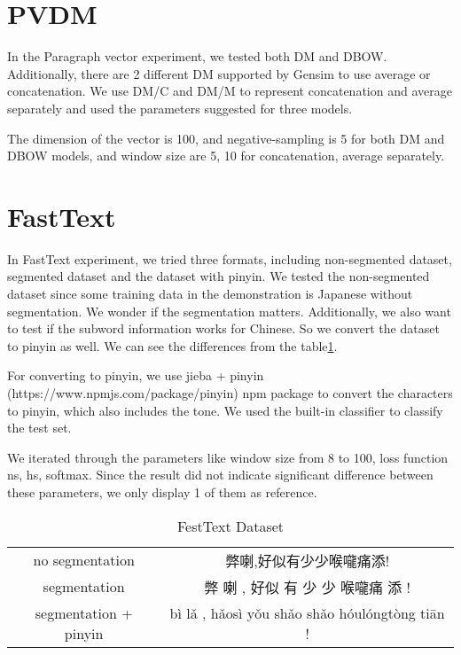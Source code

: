 \section{PVDM}

In the Paragraph vector experiment, we tested both DM and DBOW. Additionally, there are 2 different DM supported by Gensim to use average or concatenation.
We use DM/C and DM/M to represent concatenation and average separately and used the parameters suggested for three models. 

The dimension of the vector is 100, and negative-sampling is 5 for both DM and DBOW models, and window size are 5, 10 for concatenation, average separately. 


\section{FastText}

In FastText experiment, we tried three formats, including non-segmented dataset, segmented dataset and the dataset with pinyin.
We tested the non-segmented dataset since some training data in the demonstration is Japanese without segmentation. We wonder if the segmentation matters.
Additionally, we also want to test if the subword information \cite{bojanowski2016enriching} works for Chinese. So we convert the dataset to pinyin as well. We can see the differences from the table\ref{ftdataset}.

For converting to pinyin, we use jieba + pinyin (https://www.npmjs.com/package/pinyin) npm package to convert the characters to pinyin, which also includes the tone.
We used the built-in classifier to classify the test set.

We iterated through the parameters like window size from 8 to 100, loss function ns, hs, softmax.  
Since the result did not indicate significant difference between these parameters, we only display 1 of them as reference. 


\begin{table}[]
\centering
\caption{FestText Dataset}
\label{ftdataset}
\begin{tabular}{|c|c|}
\hline
   & \\
\hline
no segmentation  & 弊喇,好似有少少喉嚨痛添! \\
segmentation  & 弊 喇 , 好似 有 少 少 喉嚨痛 添 ! \\
segmentation + pinyin  & bì lǎ , hǎosì yǒu shǎo shǎo hóulóngtòng tiān ! \\
\hline
\end{tabular}
\end{table}

